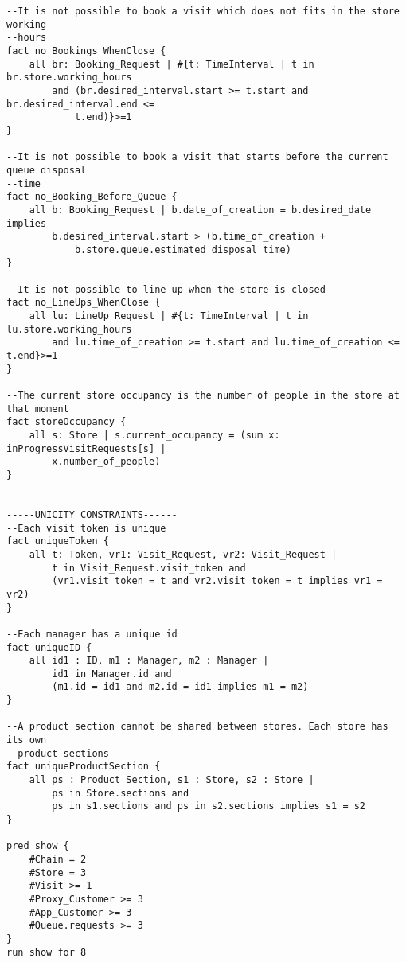 \begin{lstlisting}[language=alloy]
--It is not possible to book a visit which does not fits in the store working 
--hours
fact no_Bookings_WhenClose {
    all br: Booking_Request | #{t: TimeInterval | t in br.store.working_hours 
        and (br.desired_interval.start >= t.start and br.desired_interval.end <= 
            t.end)}>=1
}

--It is not possible to book a visit that starts before the current queue disposal
--time
fact no_Booking_Before_Queue {
    all b: Booking_Request | b.date_of_creation = b.desired_date implies 
        b.desired_interval.start > (b.time_of_creation + 
            b.store.queue.estimated_disposal_time)
}

--It is not possible to line up when the store is closed
fact no_LineUps_WhenClose {
    all lu: LineUp_Request | #{t: TimeInterval | t in lu.store.working_hours 
        and lu.time_of_creation >= t.start and lu.time_of_creation <= t.end}>=1
}

--The current store occupancy is the number of people in the store at that moment
fact storeOccupancy {
    all s: Store | s.current_occupancy = (sum x: inProgressVisitRequests[s] | 
        x.number_of_people)
}


-----UNICITY CONSTRAINTS------
--Each visit token is unique
fact uniqueToken {
    all t: Token, vr1: Visit_Request, vr2: Visit_Request | 
        t in Visit_Request.visit_token and
        (vr1.visit_token = t and vr2.visit_token = t implies vr1 = vr2)
}

--Each manager has a unique id
fact uniqueID {
    all id1 : ID, m1 : Manager, m2 : Manager | 
        id1 in Manager.id and
        (m1.id = id1 and m2.id = id1 implies m1 = m2)
}

--A product section cannot be shared between stores. Each store has its own 
--product sections
fact uniqueProductSection {
    all ps : Product_Section, s1 : Store, s2 : Store | 
        ps in Store.sections and
        ps in s1.sections and ps in s2.sections implies s1 = s2
}

pred show {
    #Chain = 2 
    #Store = 3
    #Visit >= 1
    #Proxy_Customer >= 3 
    #App_Customer >= 3
    #Queue.requests >= 3
}
run show for 8
\end{lstlisting}